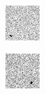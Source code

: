 \begin{figure}[!h]
\centering
    \begin{subfigure}[t]{.23\textwidth}
        \centering
        \includegraphics[width=\textwidth]{images/spotA.png}
    \end{subfigure}
    \begin{subfigure}[t]{.23\textwidth}
        \centering
        \includegraphics[width=\textwidth]{images/spotB.png}

\end{subfigure}
\end{figure}
